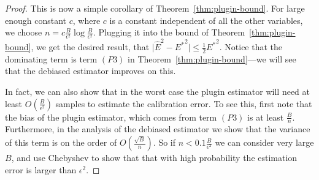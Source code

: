 \begin{finalPlugin}
\finalPluginText{}
\end{finalPlugin}

\begin{proof}
This is now a simple corollary of Theorem~\ref{thm:plugin-bound}. For large enough constant $c$, where $c$ is a constant independent of all the other variables, we choose $n = c\frac{B}{\epsilon^2} \log{\frac{B}{\epsilon^2}}$. Plugging it into the bound of Theorem~\ref{thm:plugin-bound}, we get the desired result, that $\lvert \hat{E}^2 - {E^*}^2 \rvert \leq \frac{1}{2}{E^*}^2$. Notice that the dominating term is term $(P3)$ in Theorem~\ref{thm:plugin-bound}---we will see that the debiased estimator improves on this.

In fact, we can also show that in the worst case the plugin estimator will need at least $O(\frac{B}{\epsilon^2})$ samples to estimate the calibration error. To see this, first note that the bias of the plugin estimator, which comes from term $(P3)$ is at least $\frac{B}{n}$. Furthermore, in the analysis of the debiased estimator we show that the variance of this term is on the order of $O(\frac{\sqrt{B}}{n})$. So if $n < 0.1\frac{B}{\epsilon^2}$ we can consider very large $B$, and use Chebyshev to show that that with high probability the estimation error is larger than $\epsilon^2$. 




\end{proof}
